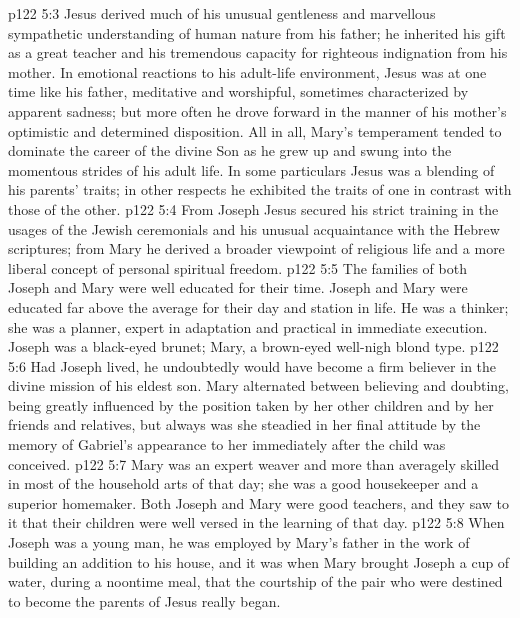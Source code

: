 \vs p122 5:3 Jesus derived much of his unusual gentleness and marvellous sympathetic understanding of human nature from his father; he inherited his gift as a great teacher and his tremendous capacity for righteous indignation from his mother. In emotional reactions to his adult\hyp{}life environment, Jesus was at one time like his father, meditative and worshipful, sometimes characterized by apparent sadness; but more often he drove forward in the manner of his mother’s optimistic and determined disposition. All in all, Mary’s temperament tended to dominate the career of the divine Son as he grew up and swung into the momentous strides of his adult life. In some particulars Jesus was a blending of his parents’ traits; in other respects he exhibited the traits of one in contrast with those of the other.
\vs p122 5:4 From Joseph Jesus secured his strict training in the usages of the Jewish ceremonials and his unusual acquaintance with the Hebrew scriptures; from Mary he derived a broader viewpoint of religious life and a more liberal concept of personal spiritual freedom.
\vs p122 5:5 The families of both Joseph and Mary were well educated for their time. Joseph and Mary were educated far above the average for their day and station in life. He was a thinker; she was a planner, expert in adaptation and practical in immediate execution. Joseph was a black\hyp{}eyed brunet; Mary, a brown\hyp{}eyed well\hyp{}nigh blond type.
\vs p122 5:6 Had Joseph lived, he undoubtedly would have become a firm believer in the divine mission of his eldest son. Mary alternated between believing and doubting, being greatly influenced by the position taken by her other children and by her friends and relatives, but always was she steadied in her final attitude by the memory of Gabriel’s appearance to her immediately after the child was conceived.
\vs p122 5:7 Mary was an expert weaver and more than averagely skilled in most of the household arts of that day; she was a good housekeeper and a superior homemaker. Both Joseph and Mary were good teachers, and they saw to it that their children were well versed in the learning of that day.
\vs p122 5:8 \pc When Joseph was a young man, he was employed by Mary’s father in the work of building an addition to his house, and it was when Mary brought Joseph a cup of water, during a noontime meal, that the courtship of the pair who were destined to become the parents of Jesus really began.
